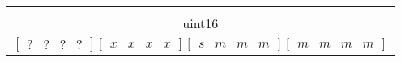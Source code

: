 \documentclass[12pt]{standalone}
\begin{document}
    \begin{minipage}{11cm}

        \begin{tabular}{|c|}
        \hline
        \\

        uint16

        \\

        \vbox{\begin{equation*}
            \begin{bmatrix}
            ? & ? & ? & ?
            \end{bmatrix}
            \begin{bmatrix}
            x & x & x & x
            \end{bmatrix}
            \begin{bmatrix}
            s & m & m & m
            \end{bmatrix}
            \begin{bmatrix}
            m & m & m & m
            \end{bmatrix}
        \end{equation*}}

        \\
        \hline
        \end{tabular}

    \end{minipage}
\end{document}
